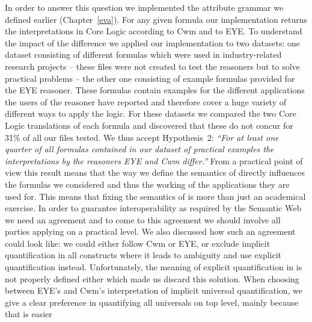 In order to answer this question we implemented the attribute grammar we defined earlier (Chapter~\ref{eva}). 
For any given \nthree formula our implementation returns the interpretations in \nthree Core Logic 
according to Cwm and to EYE. To understand the impact of the difference we applied our implementation to two datasets: one dataset consisting of different formulas which 
were used in industry-related research projects -- these files were not created to test the reasoners but to solve practical problems -- the other one consisting of example formulas 
provided for the EYE reasoner. These formulas contain examples for the different applications the users of the reasoner have reported and therefore cover a huge variety of different 
ways to apply the logic. For these datasets we compared the two \nthree Core Logic translations of each formula and discovered that these do not concur for 31\%
of all our files tested.
We thus accept Hypothesis~2: \emph{``For at least one quarter of all \nthree formulas contained in our dataset of practical examples the interpretations by the reasoners EYE and Cwm differ.''}
From a practical point of view this result means that the way we define the semantics of \nthree directly influences the formulas we considered and thus the working of the applications 
they are used for. This means that fixing the semantics of \nthree is more than just an academical exercise. In order to guarantee interoperability as required by the Semantic Web we need 
 an agreement and to come to this agreement we should involve %
all parties 
applying \nthreelogic on a practical level. %
We also discussed how such an agreement could look like: we could either follow Cwm or EYE, or exclude implicit quantification in all constructs where it leads to ambiguity and use 
explicit quantification instead. Unfortunately, the meaning of explicit quantification in \nthree is not properly defined either which made us discard this solution.
When choosing between EYE's and Cwm's interpretation of implicit universal quantification, we give a clear preference in quantifying all universals on top level, mainly because that is easier 
